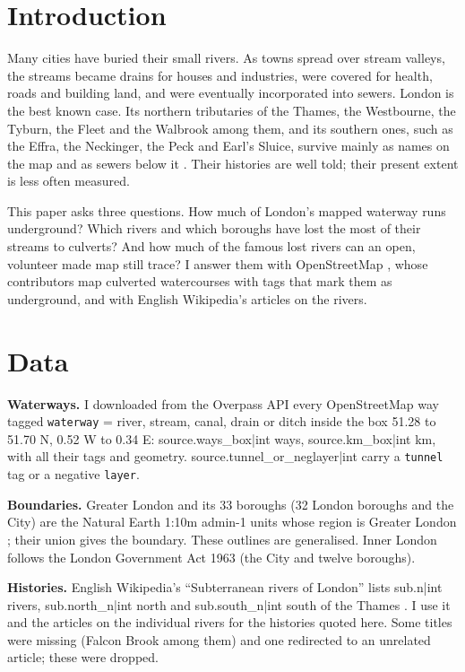 \documentclass[11pt,a4paper]{article}
\begin{document}
\section{Introduction}
Many cities have buried their small rivers. As towns spread over stream valleys, the streams became drains for houses and industries, were covered for health, roads and building land, and were eventually incorporated into sewers. London is the best known case. Its northern tributaries of the Thames, the Westbourne, the Tyburn, the Fleet and the Walbrook among them, and its southern ones, such as the Effra, the Neckinger, the Peck and Earl's Sluice, survive mainly as names on the map and as sewers below it \citep{wikisub}. Their histories are well told; their present extent is less often measured.

This paper asks three questions. How much of London's mapped waterway runs underground? Which rivers and which boroughs have lost the most of their streams to culverts? And how much of the famous lost rivers can an open, volunteer made map still trace? I answer them with OpenStreetMap \citep{osm}, whose contributors map culverted watercourses with tags that mark them as underground, and with English Wikipedia's articles on the rivers.

\section{Data}
\textbf{Waterways.} I downloaded from the Overpass API every OpenStreetMap way tagged \texttt{waterway} = river, stream, canal, drain or ditch inside the box 51.28 to 51.70 N, 0.52 W to 0.34 E: {{source.ways_box|int}} ways, {{source.km_box|int}} km, with all their tags and geometry. {{source.tunnel_or_neglayer|int}} carry a \texttt{tunnel} tag or a negative \texttt{layer}.

\textbf{Boundaries.} Greater London and its 33 boroughs (32 London boroughs and the City) are the Natural Earth 1:10m admin-1 units whose region is Greater London \citep{naturalearth}; their union gives the boundary. These outlines are generalised. Inner London follows the London Government Act 1963 (the City and twelve boroughs).

\textbf{Histories.} English Wikipedia's ``Subterranean rivers of London'' lists {{sub.n|int}} rivers, {{sub.north_n|int}} north and {{sub.south_n|int}} south of the Thames \citep{wikisub}. I use it and the articles on the individual rivers \citep{wikirivers} for the histories quoted here. Some titles were missing (Falcon Brook among them) and one redirected to an unrelated article; these were dropped.
\end{document}
